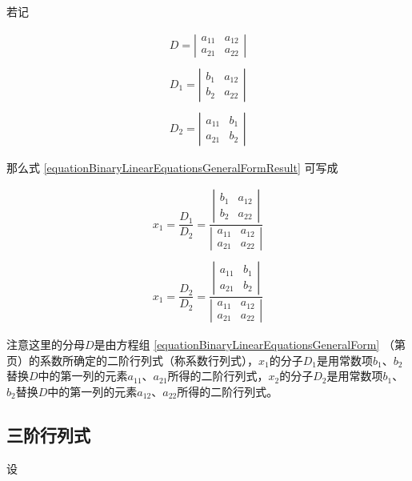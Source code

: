 若记

\begin{equation}
	\begin{array}{r}
	D = \left | \begin{array}{cc}
			a_{11} & a_{12}\\
			a_{21} & a_{22}
			\end{array} \right | \\
	\\
	D_{1} = \left | \begin{array}{cc}
		b_{1} & a_{12}\\
		b_{2} & a_{22}
		\end{array} \right | \\
	\\
	D_{2} = \left | \begin{array}{cc}
		a_{11} & b_{1}\\
		a_{21} & b_{2}
		\end{array} \right |
	\end{array}
\end{equation}

那么式 \ref{equationBinaryLinearEquationsGeneralFormResult} 可写成

\begin{equation}
	\begin{array}{r}
	x_{1}= \dfrac{D_{1}}{D_{2}} = \dfrac{\left | \begin{array}{cc}
			b_{1} & a_{12}\\
			b_{2} & a_{22}
			\end{array} \right |}{\left | \begin{array}{cc}
				a_{11} & a_{12}\\
				a_{21} & a_{22}
				\end{array} \right |}\\
	\\
	
	x_{1}= \dfrac{D_{2}}{D_{2}} = \dfrac{\left | \begin{array}{cc}
			a_{11} & b_{1}\\
			a_{21} & b_{2}
			\end{array} \right |}{\left | \begin{array}{cc}
					a_{11} & a_{12}\\
					a_{21} & a_{22}
					\end{array} \right |}
	\end{array}
\end{equation}

注意这里的分母$ D $是由方程组 \ref{equationBinaryLinearEquationsGeneralForm} （第\pageref{equationBinaryLinearEquationsGeneralForm}页）的系数所确定的二阶行列式（称系数行列式），$ x_{1} $的分子$ D_{1} $是用常数项$ b_{1} $、$ b_{2} $替换$ D $中的第一列的元素$ a_{11} $、$ a_{21} $所得的二阶行列式，$ x_{2} $的分子$ D_{2} $是用常数项$ b_{1} $、$ b_{2} $替换$ D $中的第一列的元素$ a_{12} $、$ a_{22} $所得的二阶行列式。

\subsection{三阶行列式}

\begin{MathDefinition}
	设
\end{MathDefinition}